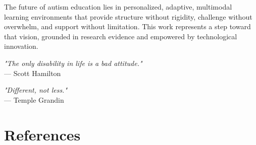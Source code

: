 \documentclass[12pt, a4paper]{article}
\begin{document}
The future of autism education lies in personalized, adaptive, multimodal learning environments that provide structure without rigidity, challenge without overwhelm, and support without limitation. This work represents a step toward that vision, grounded in research evidence and empowered by technological innovation.

\vspace{1cm}

\begin{center}
\textit{"The only disability in life is a bad attitude."} \\
--- Scott Hamilton
\end{center}

\vspace{0.5cm}

\begin{center}
\textit{"Different, not less."} \\
--- Temple Grandin
\end{center}

\newpage

\section*{References}
\end{document}
